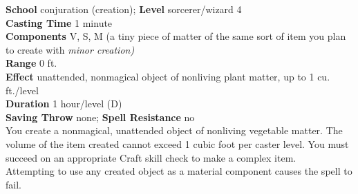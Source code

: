 \textbf{School} conjuration (creation); \textbf{Level} sorcerer/wizard 4\\
\textbf{Casting Time} 1 minute\\
\textbf{Components} V, S, M (a tiny piece of matter of the same sort of item you plan to create with \textit{minor creation)}\\
\textbf{Range} 0 ft.\\
\textbf{Effect} unattended, nonmagical object of nonliving plant matter, up to 1 cu. ft./level\\
\textbf{Duration} 1 hour/level (D)\\
\textbf{Saving Throw} none; \textbf{Spell Resistance} no\\
You create a nonmagical, unattended object of nonliving vegetable matter. The volume of the item created cannot exceed 1 cubic foot per caster level. You must succeed on an appropriate Craft skill check to make a complex item.\\
Attempting to use any created object as a material component causes the spell to fail.\\
